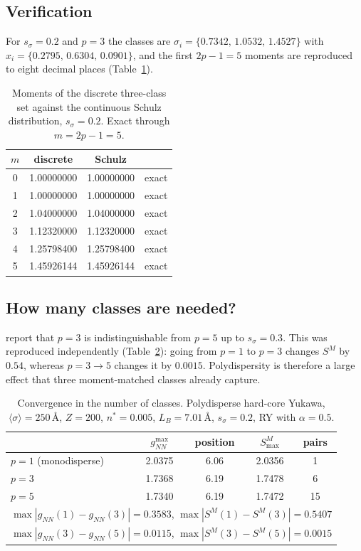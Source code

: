 \documentclass[11pt,a4paper]{article}
\begin{document}
\subsection{Verification}

For $s_\sigma=0.2$ and $p=3$ the classes are
$\sigma_i=\{0.7342,\,1.0532,\,1.4527\}$ with
$x_i=\{0.2795,\,0.6304,\,0.0901\}$, and the first $2p-1=5$ moments are
reproduced to eight decimal places (Table~\ref{tab:moments}).

\begin{table}[htbp]
\centering
\caption{Moments of the discrete three-class set against the continuous
Schulz distribution, $s_\sigma=0.2$. Exact through $m=2p-1=5$.}
\label{tab:moments}
\begin{tabular}{cccl}
\toprule
$m$ & discrete & Schulz & \\
\midrule
0 & 1.00000000 & 1.00000000 & exact \\
1 & 1.00000000 & 1.00000000 & exact \\
2 & 1.04000000 & 1.04000000 & exact \\
3 & 1.12320000 & 1.12320000 & exact \\
4 & 1.25798400 & 1.25798400 & exact \\
5 & 1.45926144 & 1.45926144 & exact \\
\bottomrule
\end{tabular}
\end{table}

\subsection{How many classes are needed?}

\cite{DAguannoKlein1992} report that $p=3$ is indistinguishable from $p=5$ up to
$s_\sigma=0.3$. This was reproduced independently
(Table~\ref{tab:pconv}): going from $p=1$ to $p=3$ changes $S^M$ by $0.54$,
whereas $p=3\rightarrow5$ changes it by $0.0015$. Polydispersity is therefore
a large effect that three moment-matched classes already capture.

\begin{table}[htbp]
\centering
\caption{Convergence in the number of classes. Polydisperse hard-core Yukawa,
$\langle\sigma\rangle=250$\,\AA, $Z=200$, $n^*=0.005$, $L_B=7.01$\,\AA,
$s_\sigma=0.2$, RY with $\alpha=0.5$.}
\label{tab:pconv}
\begin{tabular}{lcccc}
\toprule
 & $g_{NN}^{\max}$ & position & $S^{M}_{\max}$ & pairs \\
\midrule
$p=1$ (monodisperse) & 2.0375 & 6.06 & 2.0356 & 1 \\
$p=3$                & 1.7368 & 6.19 & 1.7478 & 6 \\
$p=5$                & 1.7340 & 6.19 & 1.7472 & 15 \\
\midrule
\multicolumn{5}{l}{$\max|g_{NN}(1)-g_{NN}(3)|=0.3583$,\quad
                   $\max|S^M(1)-S^M(3)|=0.5407$}\\
\multicolumn{5}{l}{$\max|g_{NN}(3)-g_{NN}(5)|=0.0115$,\quad
                   $\max|S^M(3)-S^M(5)|=0.0015$}\\
\bottomrule
\end{tabular}
\end{table}
\end{document}
